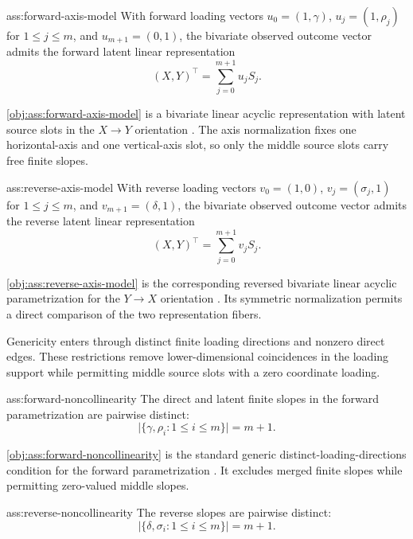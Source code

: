 \begin{assumptionv}{ass:forward-axis-model}
With forward loading vectors \(u_0=(1,\gamma)\), \(u_j=(1,\rho_j)\) for \(1\le j\le m\), and \(u_{m+1}=(0,1)\), the bivariate observed outcome vector admits the forward latent linear representation
\[
(X,Y)^\top=\sum_{j=0}^{m+1} u_j S_j .
\]
\end{assumptionv}

\cref{obj:ass:forward-axis-model} is a bivariate linear acyclic representation with latent source slots in the \(X\to Y\) orientation \citep{ChenPengHuangEtAl2025Direction}. The axis normalization fixes one horizontal-axis and one vertical-axis slot, so only the middle source slots carry free finite slopes.

\begin{assumptionv}{ass:reverse-axis-model}
With reverse loading vectors \(v_0=(1,0)\), \(v_j=(\sigma_j,1)\) for \(1\le j\le m\), and \(v_{m+1}=(\delta,1)\), the bivariate observed outcome vector admits the reverse latent linear representation
\[
(X,Y)^\top=\sum_{j=0}^{m+1} v_j S_j .
\]
\end{assumptionv}

\cref{obj:ass:reverse-axis-model} is the corresponding reversed bivariate linear acyclic parametrization for the \(Y\to X\) orientation \citep{ChenPengHuangEtAl2025Direction}. Its symmetric normalization permits a direct comparison of the two representation fibers.

Genericity enters through distinct finite loading directions and nonzero direct edges. These restrictions remove lower-dimensional coincidences in the loading support while permitting middle source slots with a zero coordinate loading.

\begin{assumptionv}{ass:forward-noncollinearity}
The direct and latent finite slopes in the forward parametrization are pairwise distinct:
\[
\bigl|\{\gamma,\rho_i:1\le i\le m\}\bigr|=m+1 .
\]
\end{assumptionv}

\cref{obj:ass:forward-noncollinearity} is the standard generic distinct-loading-directions condition for the forward parametrization \citep{SchkodaRobevaDrton2024}. It excludes merged finite slopes while permitting zero-valued middle slopes.

\begin{assumptionv}{ass:reverse-noncollinearity}
The reverse slopes are pairwise distinct:
\[
\left|\{\delta,\sigma_i:1\le i\le m\}\right|=m+1.
\]
\end{assumptionv}


